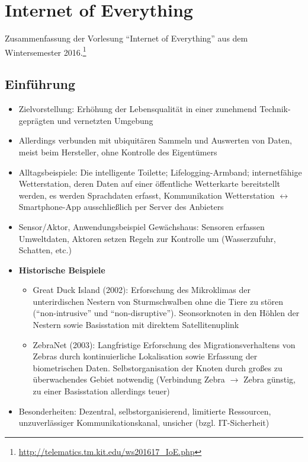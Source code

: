 \chapter{Internet of Everything}

Zusammenfassung der Vorlesung "`Internet of Everything"' aus dem Wintersemester 2016.\footnote{\url{http://telematics.tm.kit.edu/ws201617_IoE.php}}

\section{Einführung}
\begin{itemize}
	\item Zielvorstellung: Erhöhung der Lebensqualität in einer zunehmend Technik-geprägten und vernetzten Umgebung
	\item Allerdings verbunden mit ubiquitären Sammeln und Auswerten von Daten, meist beim Hersteller, ohne Kontrolle des Eigentümers
	\item Alltagsbeispiele: Die intelligente Toilette; Lifelogging-Armband; internetfähige Wetterstation, deren Daten auf einer öffentliche Wetterkarte bereitstellt werden, es werden Sprachdaten erfasst, Kommunikation Wetterstation \(\leftrightarrow\) Smartphone-App ausschließlich per Server des Anbieters
	\item Sensor/Aktor, Anwendungsbeispiel Gewächshaus: Sensoren erfassen Umweltdaten, Aktoren setzen Regeln zur Kontrolle um (Wasserzufuhr, Schatten, etc.)
	\item \textbf{Historische Beispiele}
	\begin{itemize}
		\item Great Duck Island (2002): Erforschung des Mikroklimas der unterirdischen Nestern von Sturmschwalben ohne die Tiere zu stören ("`non-intrusive"' und "`non-disruptive"'). Seonsorknoten in den Höhlen der Nestern sowie Basisstation mit direktem Satellitenuplink
		\item ZebraNet (2003): Langfristige Erforschung des Migrationsverhaltens von Zebras durch kontinuierliche Lokalisation sowie Erfassung der biometrischen Daten. Selbstorganisation der Knoten durch großes zu überwachendes Gebiet notwendig (Verbindung Zebra \(\rightarrow\) Zebra günstig, zu einer Basisstation allerdings teuer)
	\end{itemize}
	\item Besonderheiten: Dezentral, selbstorganisierend, limitierte Ressourcen, unzuverlässiger Kommunikationskanal, unsicher (bzgl. IT-Sicherheit)
\end{itemize}



